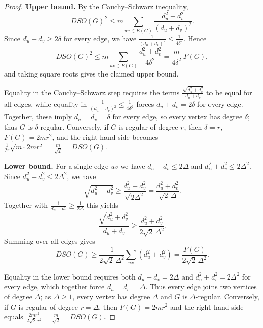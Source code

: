 \documentclass{article}
\theoremstyle{definition}
\begin{document}
\begin{proof}
\noindent\textbf{Upper bound.}
By the Cauchy--Schwarz inequality,
\[
DSO(G)^{2} \le m\sum_{uv\in E(G)}\frac{d_u^{2}+d_v^{2}}{(d_u+d_v)^{2}}.
\]
Since $d_u+d_v \ge 2\delta$ for every edge, we have $\frac{1}{(d_u+d_v)^{2}} \le \frac{1}{4\delta^{2}}$.
Hence
\[
DSO(G)^{2} \le m\sum_{uv\in E(G)}\frac{d_u^{2}+d_v^{2}}{4\delta^{2}}
= \frac{m}{4\delta^{2}}\,F(G),
\]
and taking square roots gives the claimed upper bound.

Equality in the Cauchy--Schwarz step requires the terms $\frac{\sqrt{d_u^{2}+d_v^{2}}}{d_u+d_v}$ to be equal for all edges, while equality in $\frac{1}{(d_u+d_v)^{2}} \le \frac{1}{4\delta^{2}}$ forces $d_u+d_v = 2\delta$ for every edge.
Together, these imply $d_u = d_v = \delta$ for every edge, so every vertex has degree $\delta$; thus $G$ is $\delta$-regular.
Conversely, if $G$ is regular of degree $r$, then $\delta=r$, $F(G)=2mr^{2}$, and the right‑hand side becomes $\frac{1}{2r}\sqrt{m\cdot 2mr^{2}} = \frac{m}{\sqrt{2}} = DSO(G)$.

\medskip
\noindent\textbf{Lower bound.}
For a single edge $uv$ we have $d_u+d_v \le 2\Delta$ and $d_u^{2}+d_v^{2} \le 2\Delta^{2}$.
Since $d_u^{2}+d_v^{2} \le 2\Delta^{2}$, we have
\[
\sqrt{d_u^{2}+d_v^{2}} \ge \frac{d_u^{2}+d_v^{2}}{\sqrt{2\Delta^{2}}}
= \frac{d_u^{2}+d_v^{2}}{\sqrt{2}\,\Delta}.
\]
Together with $\frac{1}{d_u+d_v} \ge \frac{1}{2\Delta}$ this yields
\[
\frac{\sqrt{d_u^{2}+d_v^{2}}}{d_u+d_v}
\ge \frac{d_u^{2}+d_v^{2}}{2\sqrt{2}\,\Delta^{2}}.
\]
Summing over all edges gives
\[
DSO(G) \ge \frac{1}{2\sqrt{2}\,\Delta^{2}}\sum_{uv}(d_u^{2}+d_v^{2})
= \frac{F(G)}{2\sqrt{2}\,\Delta^{2}}.
\]

Equality in the lower bound requires both $d_u+d_v = 2\Delta$ and $d_u^{2}+d_v^{2} = 2\Delta^{2}$ for every edge, which together force $d_u = d_v = \Delta$.
Thus every edge joins two vertices of degree $\Delta$; as $\Delta\ge 1$, every vertex has degree $\Delta$ and $G$ is $\Delta$-regular.
Conversely, if $G$ is regular of degree $r=\Delta$, then $F(G)=2mr^{2}$ and the right‑hand side equals $\frac{2mr^{2}}{2\sqrt{2}\,r^{2}} = \frac{m}{\sqrt{2}} = DSO(G)$.
\end{proof}
\end{document}
